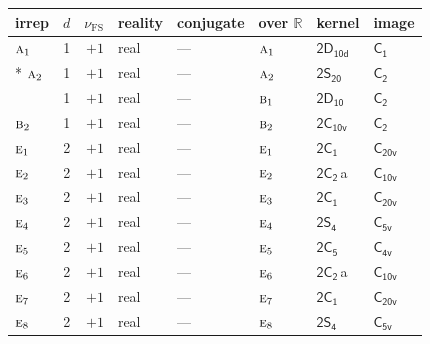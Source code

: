 \documentclass[10pt,a4paper]{article}
\numberwithin{equation}{section}
\newcommand{\grp}[1]{\mathsf{#1}}
\newcommand{\irr}[1]{\text{\normalfont\scshape #1}}
\newcommand{\detbox}[1]{{\setlength{\fboxsep}{1pt}\fbox{#1}}}
\newcommand{\clsletter}[1]{\,{\scriptsize\color{black!55}#1}}
\newcommand{\fsind}{\nu_{\mathrm{FS}}}
\begin{document}
\setlength{\emergencystretch}{2em}\par\setlength{\emergencystretch}{0pt}
{\small\renewcommand{\arraystretch}{1.25}\setlength{\tabcolsep}{4pt}\begin{longtable}{@{}lrrlllll@{}}\toprule
irrep & $d$ & $\fsind$ & reality & conjugate & over $\mathbb{R}$ & kernel & image\\\midrule\endhead
\bottomrule\endfoot\endlastfoot
$\irr{a}_{1}$ & 1 & $+1$ & real & --- & $\irr{a}_{1}$ & \href{2D10d.pdf}{$\grp{2D_{10d}}$} & \href{../../../rotation/data/pdf/C1.pdf}{$\grp{C_{1}}$}\\*
$\irr{a}_{2}$ & 1 & $+1$ & real & --- & $\irr{a}_{2}$ & \href{2S20.pdf}{$\grp{2S_{20}}$} & \href{../../../rotation/data/pdf/C2.pdf}{$\grp{C_{2}}$}\\
\detbox{$\irr{b}_{1}$} & 1 & $+1$ & real & --- & $\irr{b}_{1}$ & \href{2D10.pdf}{$\grp{2D_{10}}$} & \href{../../../rotation/data/pdf/C2.pdf}{$\grp{C_{2}}$}\\
$\irr{b}_{2}$ & 1 & $+1$ & real & --- & $\irr{b}_{2}$ & \href{2C10v.pdf}{$\grp{2C_{10v}}$} & \href{../../../rotation/data/pdf/C2.pdf}{$\grp{C_{2}}$}\\
$\irr{e}_{1}$ & 2 & $+1$ & real & --- & $\irr{e}_{1}$ & \href{2C1.pdf}{$\grp{2C_{1}}$} & $\grp{C_{20v}}$\\
$\irr{e}_{2}$ & 2 & $+1$ & real & --- & $\irr{e}_{2}$ & \href{2C2.pdf}{$\grp{2C_{2}}$}\clsletter{a} & \href{../../../rotation/data/pdf/C10v.pdf}{$\grp{C_{10v}}$}\\
$\irr{e}_{3}$ & 2 & $+1$ & real & --- & $\irr{e}_{3}$ & \href{2C1.pdf}{$\grp{2C_{1}}$} & $\grp{C_{20v}}$\\
$\irr{e}_{4}$ & 2 & $+1$ & real & --- & $\irr{e}_{4}$ & \href{2S4.pdf}{$\grp{2S_{4}}$} & \href{../../../rotation/data/pdf/C5v.pdf}{$\grp{C_{5v}}$}\\
$\irr{e}_{5}$ & 2 & $+1$ & real & --- & $\irr{e}_{5}$ & \href{2C5.pdf}{$\grp{2C_{5}}$} & \href{../../../rotation/data/pdf/C4v.pdf}{$\grp{C_{4v}}$}\\
$\irr{e}_{6}$ & 2 & $+1$ & real & --- & $\irr{e}_{6}$ & \href{2C2.pdf}{$\grp{2C_{2}}$}\clsletter{a} & \href{../../../rotation/data/pdf/C10v.pdf}{$\grp{C_{10v}}$}\\
$\irr{e}_{7}$ & 2 & $+1$ & real & --- & $\irr{e}_{7}$ & \href{2C1.pdf}{$\grp{2C_{1}}$} & $\grp{C_{20v}}$\\
$\irr{e}_{8}$ & 2 & $+1$ & real & --- & $\irr{e}_{8}$ & \href{2S4.pdf}{$\grp{2S_{4}}$} & \href{../../../rotation/data/pdf/C5v.pdf}{$\grp{C_{5v}}$}\\

\end{longtable}}
\end{document}
